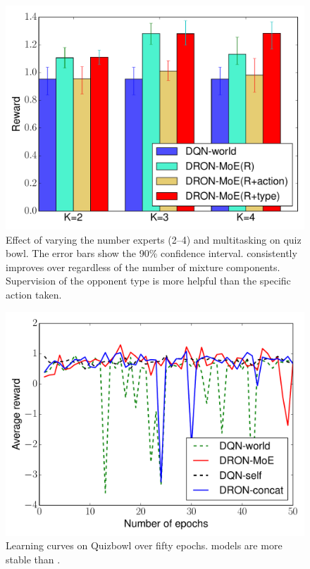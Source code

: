 \begin{figure}
\centering
\includegraphics[width=0.6\linewidth]{2016_icml_opponent/figures/qb_moe_bar}
\caption{Effect of varying the number experts (2--4) and multitasking on quiz bowl.  The
  error bars show the 90\% confidence interval.  \dronmoe{} consistently
  improves over \dqn{} regardless of the number of mixture components.
  Supervision of the opponent type is more helpful than the specific
  action taken.  }

\label{fig:qb_moe_bar}
\end{figure}

\begin{figure}
\centering
\includegraphics[width=0.6\linewidth]{2016_icml_opponent/figures/qb_all_test_rewards}
\caption{Learning curves on Quizbowl over fifty epochs. \dron{} models are more
  stable than \dqn{}.}
\label{fig:qb_all_test_rewards}
\end{figure}